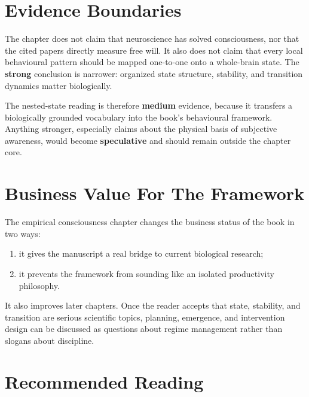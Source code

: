 \section{Evidence Boundaries}

The chapter does not claim that neuroscience has solved consciousness, nor
that the cited papers directly measure free will. It also does not claim that
every local behavioural pattern should be mapped one-to-one onto a whole-brain
state. The \textbf{strong} conclusion is narrower: organized state structure,
stability, and transition dynamics matter biologically.

The nested-state reading is therefore \textbf{medium} evidence, because it
transfers a biologically grounded vocabulary into the book's behavioural
framework. Anything stronger, especially claims about the physical basis of
subjective awareness, would become \textbf{speculative} and should remain
outside the chapter core.

\section{Business Value For The Framework}

The empirical consciousness chapter changes the business status of the book in
two ways:
\begin{enumerate}[nosep]
  \item it gives the manuscript a real bridge to current biological research;
  \item it prevents the framework from sounding like an isolated productivity
        philosophy.
\end{enumerate}

It also improves later chapters. Once the reader accepts that state,
stability, and transition are serious scientific topics, planning, emergence,
and intervention design can be discussed as questions about regime management
rather than slogans about discipline.

\section{Recommended Reading}

